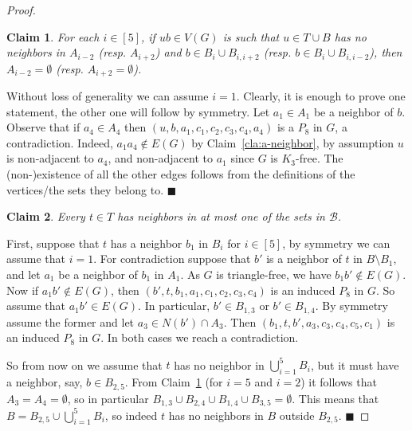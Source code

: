 \documentclass[11pt,a4paper]{article}
\theoremstyle{mystyle}
\newtheorem{claim}{Claim}[theorem]
\newenvironment{claimproof}{\noindent {\emph{Proof of Claim.}}}{\hfill$\blacksquare$\medskip}
\newcommand{\cB}{\mathcal{B}}
\begin{document}
\begin{proof}

\begin{claim}\label{cla:p8-found}
For each $i \in [5]$, if $ub \in V(G)$ is such that $u \in T \cup B$ has no neighbors in $A_{i-2}$ (resp. $A_{i+2}$) and $b \in B_i \cup B_{i,i+2}$ (resp. $b \in B_i \cup B_{i,i-2}$), then $A_{i-2}=\emptyset$ (resp. $A_{i+2}=\emptyset$).
\end{claim}
\begin{claimproof}
Without loss of generality we can assume $i=1$. Clearly, it is enough to prove one statement, the other one will follow by symmetry. Let $a_1 \in A_1$ be a neighbor of $b$.
Observe that if $a_4 \in A_4$ then $(u,b,a_1,c_1,c_2,c_3,c_4,a_4)$ is a $P_8$ in $G$, a contradiction. 
    Indeed, $a_1a_4 \notin E(G)$ by Claim~\ref{cla:a-neighbor}, by assumption $u$ is non-adjacent to $a_4$, and non-adjacent to $a_1$ since $G$ is $K_3$-free. 
    The (non-)existence of all the other edges follows from the definitions of the vertices/the sets they belong to.
\end{claimproof}

\begin{claim}\label{cla:t-neighbors}
Every $t \in T$ has neighbors in at most one of the sets in $\cB$.
\end{claim}
\begin{claimproof}
First, suppose that $t$ has a neighbor $b_1$ in $B_i$ for $i \in [5]$, by symmetry we can assume that $i=1$.
For contradiction suppose that $b'$ is a neighbor of $t$ in $B \setminus B_1$, and let $a_1$ be a neighbor of $b_1$ in $A_1$.
As $G$ is triangle-free, we have $b_1b' \notin E(G)$.
Now if $a_1b' \notin E(G)$, then $(b',t,b_1,a_1,c_1,c_2,c_3,c_4)$ is an induced $P_8$ in $G$.
So assume that $a_1b' \in E(G)$. In particular, $b' \in B_{1,3}$ or $b' \in B_{1,4}$. By symmetry assume the former and let $a_3 \in N(b') \cap A_3$.
Then $(b_1,t,b',a_3,c_3,c_4,c_5,c_1)$ is an induced $P_8$ in $G$. In both cases we reach a contradiction.

So from now on we assume that $t$ has no neighbor in $\bigcup_{i=1}^5 B_i$, but it must have a neighbor, say, $b \in B_{2,5}$.
From Claim~\ref{cla:p8-found} (for $i=5$ and $i=2$) it follows that
$A_3 = A_4 = \emptyset$, so in particular $B_{1,3} \cup B_{2,4} \cup B_{1,4} \cup B_{3,5} = \emptyset$.
This means that $B = B_{2,5} \cup \bigcup_{i=1}^5 B_i$, so indeed $t$ has no neighbors in $B$ outside $B_{2,5}$.
\end{claimproof}


\end{proof}
\end{document}
